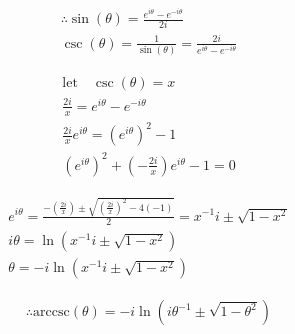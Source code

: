 \documentclass{../../style}
\begin{document}
\euler

\begin{gather*}
	\therefore \sin(\theta) = \frac{e^{i\theta} - e^{-i\theta}}{2i} \\
	\csc(\theta) = \frac{1}{\sin(\theta)} = \frac{2i}{e^{i\theta} - e^{-i\theta}}
\end{gather*}

\begin{gather*}
	\text{let} \quad \csc(\theta) = x \\
	\frac{2i}{x} = e^{i\theta} - e^{-i\theta} \\
	\frac{2i}{x}e^{i\theta} = (e^{i\theta})^2 - 1 \\ 
	(e^{i\theta})^2 + (-\frac{2i}{x})e^{i\theta} - 1 = 0
\end{gather*}

\begin{gather*}
	e^{i\theta} = \frac{-(\frac{2i}{x}) \pm \sqrt{(\frac{2i}{x})^2 - 4(-1)}}{2} = x^{-1}i \pm \sqrt{1 - x^2} \\
	i\theta = \ln(x^{-1}i \pm \sqrt{1 - x^2}) \\
	\theta = -i\ln(x^{-1}i \pm \sqrt{1 - x^2})
\end{gather*}

\begin{gather*}
	\therefore \text{arccsc}(\theta) = -i\ln(i\theta^{-1} \pm \sqrt{1 -\theta^2})
\end{gather*}
\end{document}
